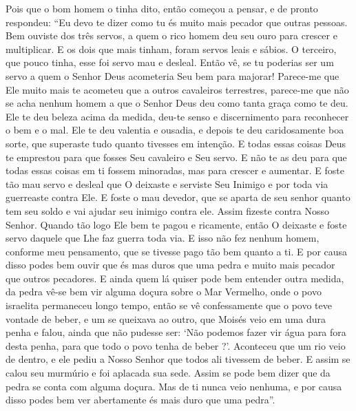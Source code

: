 Pois que o bom homem o tinha dito, então começou a pensar, e de pronto
respondeu: “Eu devo te dizer como tu és muito mais pecador que outras pessoas.
Bem ouviste dos três servos, a quem o rico homem deu seu ouro para crescer e
multiplicar. E os dois que mais tinham, foram servos leais e sábios. O
terceiro, que pouco tinha, esse foi servo mau e desleal. Então vê, se tu
poderias ser um servo a quem o Senhor Deus acometeria Seu bem para majorar!
Parece-me que Ele muito mais te acometeu que a outros cavaleiros terrestres,
parece-me que não se acha nenhum homem a que o Senhor Deus deu como tanta graça
como te deu. Ele te deu beleza acima da medida, deu-te senso e discernimento
para reconhecer o bem e o mal. Ele te deu valentia e ousadia, e depois te deu
caridosamente boa sorte, que superaste tudo quanto tivesses em intenção. 
E todas essas coisas Deus te emprestou para que fosses Seu
cavaleiro e Seu servo. E não te as deu para que todas essas coisas em ti fossem
minoradas, mas para crescer e aumentar. E foste tão mau servo e desleal que O
deixaste e serviste Seu Inimigo e por toda via guerreaste contra Ele. E foste o
mau devedor, que se aparta de seu senhor quanto tem seu soldo e vai ajudar seu
inimigo contra ele. Assim fizeste contra Nosso Senhor. Quando tão logo Ele bem
te pagou e ricamente, então O deixaste e foste servo daquele que Lhe faz guerra
toda via. E isso não fez nenhum homem, conforme meu pensamento, que se tivesse
pago tão bem quanto a ti. E por causa disso podes bem ouvir que és mas duros
que uma pedra e muito mais pecador que outros pecadores. E ainda quem lá quiser
pode bem entender outra medida, da pedra vê-se bem vir alguma doçura sobre o
Mar Vermelho, onde o povo israelita permaneceu longo tempo, então se vê
confessamente que o povo teve vontade de beber, e um se queixava ao outro, que
Moisés veio em uma dura penha e falou, ainda que não pudesse ser: ‘Não podemos
fazer vir água para fora desta penha, para que todo o povo tenha de beber ?’.
Aconteceu que um rio veio de dentro, e ele pediu a Nosso Senhor que todos ali
tivessem de beber. E assim se calou seu murmúrio e foi aplacada sua sede. Assim
se pode bem dizer que da pedra se conta com alguma doçura. Mas de ti nunca veio
nenhuma, e por causa disso podes bem ver abertamente és mais duro que uma
pedra”. 

